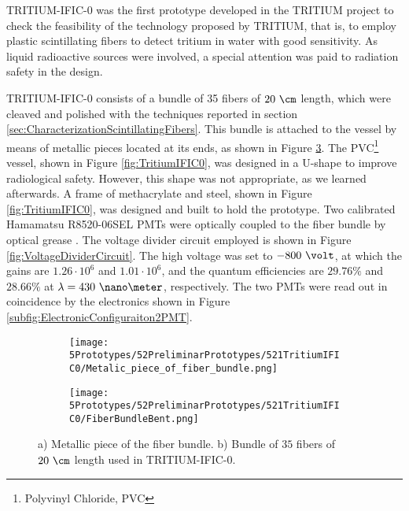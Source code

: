 TRITIUM-IFIC-0 was the first prototype developed in the TRITIUM project to check the feasibility of the technology proposed by TRITIUM, that is, to employ plastic scintillating fibers to detect tritium in water with good sensitivity. As liquid radioactive sources were involved, a special attention was paid to radiation safety in the design.

TRITIUM-IFIC-0 consists of a bundle of 35 fibers of $20~\cm$ length, which were cleaved and polished with the techniques reported in section \ref{sec:CharacterizationScintillatingFibers}. This bundle is attached to the vessel by means of metallic pieces located at its ends, as shown in Figure \ref{fig:FiberBundleOfTritiumIFIC0}. The PVC\footnote{Polyvinyl Chloride, PVC} vessel, shown in Figure \ref{fig:TritiumIFIC0}, was designed in a U-shape to improve radiological safety. However, this shape was not appropriate, as we learned afterwards. A frame of methacrylate and steel, shown in Figure \ref{fig:TritiumIFIC0}, was designed and built to hold the prototype. Two calibrated Hamamatsu R8520-06SEL PMTs \cite{DataSheetPMTs} were optically coupled to the fiber bundle by optical grease \cite{OpticalGrease}. The voltage divider circuit employed is shown in Figure  \ref{fig:VoltageDividerCircuit}. The high voltage was set to $-800~\volt$, at which the gains are $1.26 \cdot{} 10^6$ and $1.01 \cdot{} 10^6$, and the quantum efficiencies are $29.76\%$ and $28.66\%$ at $\lambda=430~\nano\meter$, respectively. The two PMTs were read out in coincidence by the electronics shown in Figure \ref{subfig:ElectronicConfiguraiton2PMT}.

\begin{figure}
\centering
    \begin{subfigure}[b]{0.5\textwidth}
    \centering
    \texttt{[image: 5Prototypes/52PreliminarPrototypes/521TritiumIFIC0/Metalic\_piece\_of\_fiber\_bundle.png]}  
    \caption{\label{subfig:MetalicPieceFiberBunchTritiumIFIC0}}
    \end{subfigure}
    \hfill
    \begin{subfigure}[b]{0.4\textwidth}
    \centering
    \texttt{[image: 5Prototypes/52PreliminarPrototypes/521TritiumIFIC0/FiberBundleBent.png]}  
    \caption{\label{subfig:FiberBunchTritiumIFIC0Bent}}
    \end{subfigure}
 \caption{a) Metallic piece of the fiber bundle. b) Bundle of $35$ fibers of $20~\cm$ length used in TRITIUM-IFIC-0.} \label{fig:FiberBundleOfTritiumIFIC0}
\end{figure}

